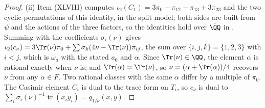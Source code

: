 \begin{proof}
(ii) Item (XLVIII) computes
$\iota_{2}(C_{1})=3\pi_{0}-\pi_{12}-\pi_{13}+3\pi_{23}$ and the two cyclic
permutations of this identity, in the split model; both sides are built
from $\psi$ and the actions of the three factors, so the identities hold over
$\bar{\QQ}$ in . Summing with the coefficients
$\sigma_{i}(\nu)$ gives $\iota_{2}(c_{\nu})=3\Tr(\nu)\pi_{0}+
\sum\sigma_{k}(4\nu-\Tr(\nu))\pi_{ij}$, the sum over $\{i,j,k\}=\{1,2,3\}$ with
$i<j$, which is $\omega_{a}$ with the stated $a_{0}$ and $\alpha$. Since
$\Tr(\nu)\in\QQ$, the element $\alpha$ is rational exactly when $\nu$ is; and
$\Tr(\alpha)=\Tr(\nu)$, so $\nu=(\alpha+\Tr(\alpha))/4$ recovers $\nu$ from
any $\alpha\in F$. Two rational classes with the same $\alpha$ differ by a
multiple of $\pi_{0}$. The Casimir element $C_{i}$ is dual to the trace form
on $T_{i}$, so $c_{\nu}$ is dual to $\sum_{i}\sigma_{i}(\nu)^{-1}
\operatorname{tr}(x_{i}y_{i})=q_{1/\nu}(x,y)$.


\end{proof}
